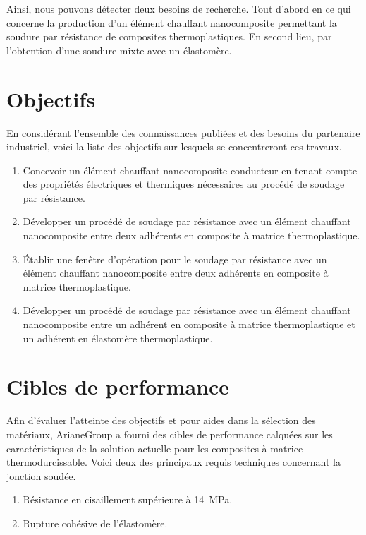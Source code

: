 Ainsi, nous pouvons détecter deux besoins de recherche. 
Tout d'abord en ce qui concerne la production d'un élément chauffant nanocomposite permettant la soudure par résistance de composites thermoplastiques. 
En second lieu, par l'obtention d'une soudure mixte avec un élastomère. 

\section{Objectifs}

En considérant l'ensemble des connaissances publiées et des besoins du partenaire industriel, voici la liste des objectifs sur lesquels se concentreront ces travaux. 

\begin{enumerate}
	\item Concevoir un élément chauffant nanocomposite conducteur en tenant compte des propriétés électriques et thermiques nécessaires au procédé de soudage par résistance. 
	\item Développer un procédé de soudage par résistance avec un élément chauffant nanocomposite entre deux adhérents en composite à matrice thermoplastique. 
	\item Établir une fenêtre d'opération pour le soudage par résistance avec un élément chauffant nanocomposite entre deux adhérents en composite à matrice thermoplastique. 
	\item Développer un procédé de soudage par résistance avec un élément chauffant nanocomposite entre un adhérent en composite à matrice thermoplastique et un adhérent en élastomère thermoplastique. 
\end{enumerate}

\section{Cibles de performance}

Afin d'évaluer l'atteinte des objectifs et pour aides dans la sélection des matériaux, ArianeGroup a fourni des cibles de performance calquées sur les caractéristiques de la solution actuelle pour les composites à matrice thermodurcissable. 
Voici deux des principaux requis techniques concernant la jonction soudée. 

\begin{enumerate}
	\item Résistance en cisaillement supérieure à \SI{14}{\mega\pascal}. 
	\item Rupture cohésive de l'élastomère. 
\end{enumerate}


